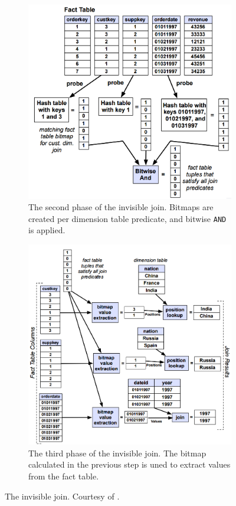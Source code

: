 \begin{figure}
\begin{subfigure}{0.45\textwidth}
    \includegraphics[width=\textwidth]{img/invisible-join-2.png}
    \caption{The second phase of the invisible join. Bitmaps are created per dimension table predicate, and bitwise \texttt{AND} is applied.}
    \label{fig:invisible-join-2} 
  \end{subfigure}
  \begin{subfigure}{0.45\textwidth}
    \includegraphics[width=\textwidth]{img/invisible-join-3.png}
    \caption{The third phase of the invisible join. The bitmap calculated in the previous step is uned to extract values from the fact table.}
    \label{fig:invisible-join-3} 
  \end{subfigure}
  \caption{The invisible join. Courtesy of \cite{Abadi2008-dd}.}
  \label{fig:invisible-join} 
\end{figure}
